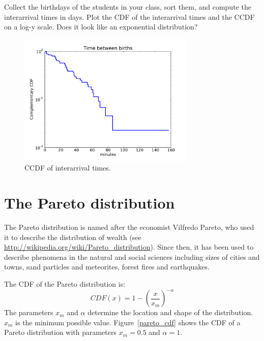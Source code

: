 \documentclass[12pt]{book}
\begin{document}
\begin{exercise}
Collect the birthdays of the students in your class, sort them, and
compute the interarrival times in days.  Plot the CDF of the interarrival
times and the CCDF on a log-y scale.  Does it look like
an exponential distribution?

\end{exercise}


\begin{figure}
\centerline{\includegraphics[height=2.5in]{figs/interarrivals_logy.pdf}}
\caption{CCDF of interarrival times.}
\label{interarrival_ccdf}
\end{figure}


\section{The Pareto distribution}

The Pareto distribution is named after the economist Vilfredo Pareto,
who used it to describe the distribution of wealth (see
\url{http://wikipedia.org/wiki/Pareto_distribution}).  Since then, it has
been used to describe phenomena in the natural and social
sciences including sizes of cities and towns, sand particles and
meteorites, forest fires and earthquakes.

The CDF of the Pareto distribution is:
%
\[ CDF(x) = 1 - \left( \frac{x}{x_m} \right) ^{-\alpha} \]
%
The parameters $x_{m}$ and $\alpha$ determine the location and shape of
the distribution. $x_{m}$ is the minimum possible value.
Figure~\ref{pareto_cdf} shows the CDF of a Pareto distribution with
parameters $x_{m} = 0.5$ and $\alpha = 1$.
\end{document}
